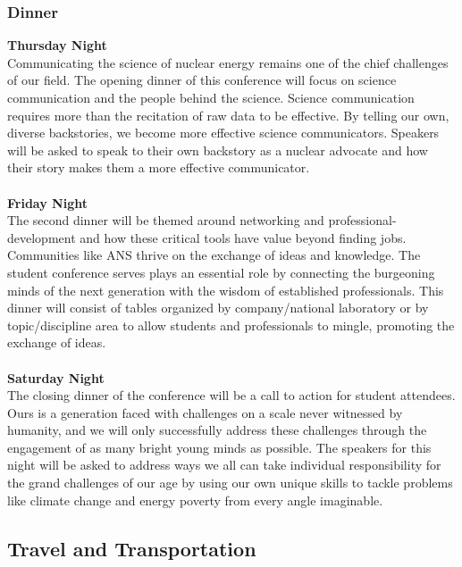 \subsubsection{Dinner}

\textbf{Thursday Night}\\
Communicating the science of nuclear energy remains one of the chief challenges of our field. The opening dinner of this conference will focus on science communication and the people behind the science. Science communication requires more than the recitation of raw data to be effective. By telling our own, diverse backstories, we become more effective science communicators. Speakers will be asked to speak to their own backstory as a nuclear advocate and how their story makes them a more effective communicator.\\\\
\indent\textbf{Friday Night}\\
The second dinner will be themed around networking and professional-development and how these critical tools have value beyond finding jobs. Communities like ANS thrive on the exchange of ideas and knowledge. The student conference serves plays an essential role by connecting the burgeoning minds of the next generation with the wisdom of established professionals. This dinner will consist of tables organized by company/national laboratory or by topic/discipline area to allow students and professionals to mingle, promoting the exchange of ideas.\\\\ 
\indent\textbf{Saturday Night}\\
The closing dinner of the conference will be a call to action for student attendees. Ours is a generation faced with challenges on a scale never witnessed by humanity, and we will only successfully address these challenges through the engagement of as many bright young minds as possible. The speakers for this night will be asked to address ways we all can take individual responsibility for the grand challenges of our age by using our own unique skills to tackle problems like climate change and energy poverty from every angle imaginable.\\ 
\subsection{Travel and Transportation}

